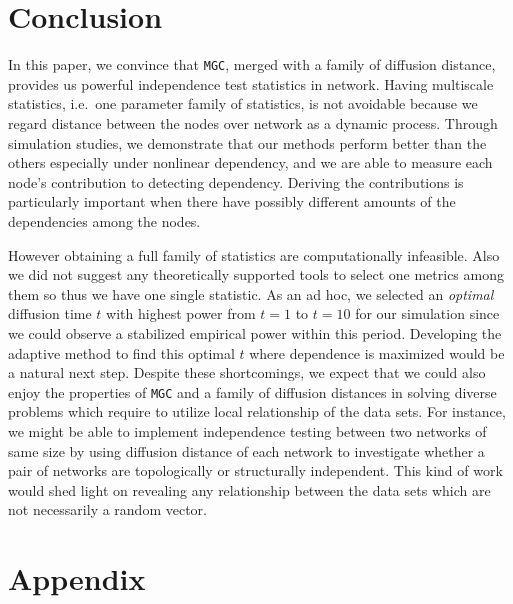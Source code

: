 \documentclass[11pt]{article}
\theoremstyle{definition}
\begin{document}
\vspace*{-0.5cm}
\section{Conclusion}
\label{sec:conc}
	\vspace*{-0.2cm}
In this paper, we convince that \texttt{MGC}, merged with a family of diffusion distance, provides us powerful independence test statistics in network. Having multiscale statistics, i.e.~one parameter family of statistics, is not avoidable because we regard distance between the nodes over network as a dynamic process. Through simulation studies, we demonstrate that our methods perform better than the others especially under nonlinear dependency, and we are able to measure each node's contribution to detecting dependency. Deriving the contributions is particularly important when there have possibly different amounts of the dependencies among the nodes.  

However obtaining a full family of statistics are computationally infeasible. Also we did not suggest any theoretically supported tools to select one metrics among them so thus we have one single statistic. As an ad hoc, we selected an \textit{optimal} diffusion time $t$ with highest power from $t=1$ to $t=10$ for our simulation since we could observe a stabilized empirical power within this period. Developing the adaptive method to find this optimal $t$ where dependence is maximized would be a natural next step. Despite these shortcomings, we expect that we could also enjoy the properties of \texttt{MGC} and a family of diffusion distances in solving diverse problems which require to utilize local relationship of the data sets. For instance, we might be able to implement independence testing between two networks of same size by using diffusion distance of each network to investigate whether a pair of networks are topologically or structurally independent. This kind of work would shed light on revealing any relationship between the data sets which are not necessarily a random vector.

\vspace*{-0.5cm}

%
\vspace*{-0.5cm}
\section{Appendix}
\vspace*{-0.2cm}
\end{document}
